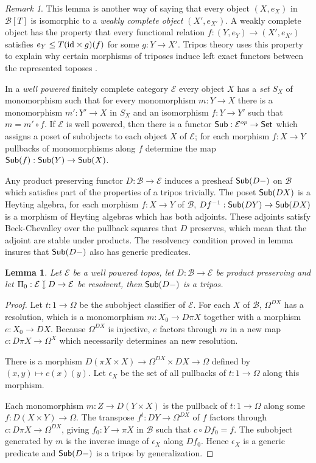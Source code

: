 \documentclass[sort&compress]{elsarticle}
\theoremstyle{plain}
\newtheorem{lemma}[theorem]{Lemma}
\theoremstyle{definition}
\theoremstyle{remark}
\newtheorem{remark}[theorem]{Remark}
\newcommand\cat\mathcal
\newcommand{\downmono}{\mathbin{\rotatebox[origin=c]{-90}{$\rightarrowtail$}}}
\begin{document}
\begin{remark} This lemma is another way of saying that every object $(X,e_X)$ in $\cat B[T]$ is isomorphic to a \emph{weakly complete object} $(X',e_{X'})$. A weakly complete object has the property that every functional relation $f:(Y,e_Y) \to (X', e_{X'})$ satisfies $e_Y\leq T(\mathrm{id}\times g)(f)$ for some $g:Y\to X'$. Tripos theory uses this property to explain why certain morphisms of triposes induce left exact functors between the represented toposes \citep{a2CAotTtTC,Pittsthesis,MR578267,MR2479466}.
\end{remark}

In a \emph{well powered} finitely complete category $\cat E$ every object $X$ has a \emph{set} $S_X$ of monomorphism such that for every monomorphism $m:Y\to X$ there is a monomorphism $m':Y'\to X$ in $S_X$ and an isomorphism $f:Y\to Y'$ such that $m=m'\circ f$. If $\cat E$ is well powered, then there is a functor $\sub:\cat E\dual \to \Set$ which assigns a poset of subobjects to each object $X$ of $\cat E$; for each morphism $f:X\to Y$ pullbacks of monomorphisms along $f$ determine the map $\mathsf{Sub}(f):\mathsf{Sub}(Y)\to \mathsf{Sub}(X)$. 

Any product preserving functor $D:\cat B \to\cat E$ induces a presheaf $\mathsf{Sub}(D-)$ on $\cat B$ which satisfies part of the properties of a tripos trivially. The poset $\mathsf{Sub}(DX)$ is a Heyting algebra, for each morphism $f:X\to Y$ of $\cat B$, $Df^{-1}:\mathsf{Sub}(DY) \to \mathsf{Sub}(DX)$ is a morphism of Heyting algebras which has both adjoints. These adjoints satisfy Beck-Chevalley over the pullback squares that $D$ preserves, which mean that the adjoint are stable under products. The resolvency condition proved in lemma \label{trico} insures that $\mathsf{Sub}(D-)$ also has generic predicates.

\begin{lemma} Let $\cat E$ be a well powered topos, let $D:\cat B \to\cat E$ be product preserving and let $\Pi_0:\cat E\downmono D \to \cat E$ be resolvent, then $\mathsf{Sub}(D-)$ is a tripos. \label{cotrip} \end{lemma}

\begin{proof} Let $t:1\to\Omega$ be the subobject classifier of $\cat E$. For each $X$ of $\cat B$, $\Omega^{DX}$ has a resolution, which is a monomorphism $m:X_0\to D\pi X$ together with a morphism $e:X_0 \to DX$. Because $\Omega^{DX}$ is injective, $e$ factors through $m$ in a new map $c: D\pi X \to \Omega^X$ which necessarily determines an new resolution.

There is a morphism $D(\pi X\times X) \to \Omega^{DX}\times DX \to \Omega$ defined by $(x,y)\mapsto c(x)(y)$. Let $\epsilon_X$ be the set of all pullbacks of $t:1\to \Omega$ along this morphism.

Each monomorphism $m:Z \to D(Y\times X)$ is the pullback of $t:1\to\Omega$ along some $f:D(X\times Y) \to \Omega$. The transpose $f^t: DY \to \Omega^{DX}$ of $f$ factors through $c:D\pi X \to \Omega^{DX}$, giving $f_0: Y \to \pi X$ in $\cat B$ such that $c\circ Df_0 = f$. The subobject generated by $m$ is the inverse image of $\epsilon_X$ along $Df_0$. Hence $\epsilon_X$ is a generic predicate and $\mathsf{Sub}(D-)$ is a tripos by generalization.
\end{proof}
\end{document}

